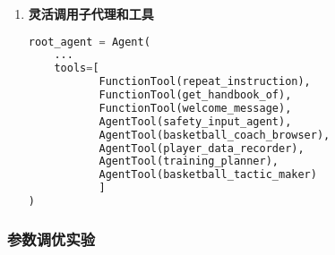 \documentclass{article}
\theoremstyle{plain}
\theoremstyle{definition}
\theoremstyle{remark}
\begin{document}
\begin{enumerate}
    \item \textbf{灵活调用子代理和工具}
    \begin{lstlisting}[language=Python]
        root_agent = Agent(
    ...
    tools=[
           FunctionTool(repeat_instruction),
           FunctionTool(get_handbook_of),
           FunctionTool(welcome_message),
           AgentTool(safety_input_agent),
           AgentTool(basketball_coach_browser),
           AgentTool(player_data_recorder),
           AgentTool(training_planner),
           AgentTool(basketball_tactic_maker)
           ]
) 
    \end{lstlisting}
\end{enumerate}

\subsubsection{参数调优实验}
\end{document}
